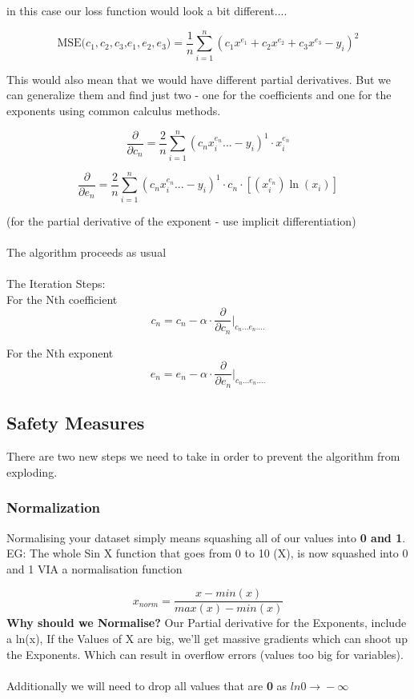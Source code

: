 \documentclass[11pt]{article}
\begin{document}
in this case our loss function would look a bit different....

\[
\text{MSE(\(c_1,c_2,c_3\),\(e_1,e_2,e_3\))} = \frac{1}{n} \sum_{i=1}^{n} (c_1x^{e_1} + c_2x^{e_2} + c_3x^{e_3} - y_i)^2
\]

This would also mean that we would have different partial derivatives. But we can generalize them and find just two - one for the coefficients and one for the exponents using common calculus methods.


\[
\frac{\partial}{\partial \text{\(c_n\)}}
= \frac{2}{n} \sum_{i=1}^n (c_nx^{e_n}_i ... - y_i)^1 \cdot x^{e_n}_i
\]

\[
\frac{\partial}{\partial \text{\(e_n\)}}
= \frac{2}{n} \sum_{i=1}^n (c_nx^{e_n}_i ... - y_i)^1 \cdot c_n \cdot [(x^{e_n}_i)\ln(x_i)]
\]

(for the partial derivative of the exponent - use implicit differentiation) \\\\The algorithm proceeds as usual \\\\The Iteration Steps:\\

For the Nth coefficient
\[c_n = c_n - \alpha \cdot \frac{\partial}{\partial c_n} \Big|_{c_n...e_n....}\]

For the Nth exponent
\[e_n = e_n - \alpha \cdot \frac{\partial}{\partial e_n} \Big|_{c_n...e_n....}\]

\subsection{Safety Measures}
There are two new steps we need to take in order to prevent the algorithm from exploding.

\subsubsection{Normalization}

Normalising your dataset simply means squashing all of our values into \textbf{0 and 1}. EG: The whole Sin X function that goes from 0 to 10 (X), is now squashed into 0 and 1 VIA a normalisation function

\[
x_{norm} =\frac{x - min(x)}{max(x) - min(x)}
\]
\textbf{Why should we Normalise?}
Our Partial derivative for the Exponents, include a ln(x), If the Values of X are big, we'll get massive gradients which can shoot up the Exponents. Which can result in overflow errors (values too big for variables). \\\\Additionally we will need to drop all values that are \textbf{0} as \(ln{0} \xrightarrow{} -\infty\)
\end{document}
